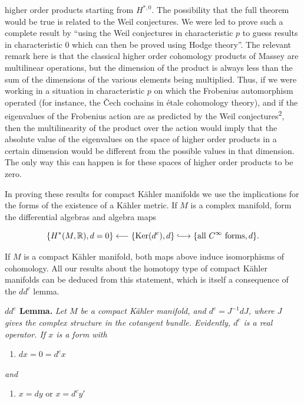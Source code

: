 \documentclass[
  english,
  a3paper,
  a3paper]{extarticle}
\providecommand{\tightlist}{%
  \setlength{\itemsep}{0pt}\setlength{\parskip}{0pt}}
\begin{document}
higher order products starting from \(H^{*,0}\). The possibility that
the full theorem would be true is related to the Weil conjectures. We
were led to prove such a complete result by ``using the Weil conjectures
in characteristic \(p\) to guess results in characteristic \(0\) which
can then be proved using Hodge theory''. The relevant remark here is
that the classical higher order cohomology products of Massey are
multilinear operations, but the dimension of the product is always less
than the sum of the dimensions of the various elements being multiplied.
Thus, if we were working in a situation in characteristic \(p\) on which
the Frobenius automorphism operated (for instance, the Čech cochains in
étale cohomology theory), and if the eigenvalues of the Frobenius action
are as predicted by the Weil conjectures\textsuperscript{2}, then the
multilinearity of the product over the action would imply that the
absolute value of the eigenvalues on the space of higher order products
in a certain dimension would be different from the possible values in
that dimension. The only way this can happen is for these spaces of
higher order products to be zero.

In proving these results for compact Kähler manifolds we use the
implications for the forms of the existence of a Kähler metric. If \(M\)
is a complex manifold, form the differential algebras and algebra maps

\[
\{H^*(M,\mathbb R),d=0\}\longleftarrow\{\operatorname{Ker}(d^c),d\}\lhook\joinrel\longrightarrow\{\text{all }C^\infty\text{ forms},d\}.
\]

If \(M\) is a compact Kähler manifold, both maps above induce
isomorphisms of cohomology. All our results about the homotopy type of
compact Kähler manifolds can be deduced from this statement, which is
itself a consequence of the \(dd^c\) lemma.

\textbf{\(dd^c\) Lemma.} \emph{Let \(M\) be a compact Kähler manifold,
and \(d^c=J^{-1}dJ\), where \(J\) gives the complex structure in the
cotangent bundle. Evidently, \(d^c\) is a real operator. If \(x\) is a
form with}

\begin{enumerate}
\def\labelenumi{\arabic{enumi})}
\tightlist
\item
  \(dx=0=d^c x\)
\end{enumerate}

\emph{and}

\begin{enumerate}
\def\labelenumi{\arabic{enumi})}
\setcounter{enumi}{1}
\tightlist
\item
  \(x=dy\) or \(x=d^c y'\)
\end{enumerate}
\end{document}
